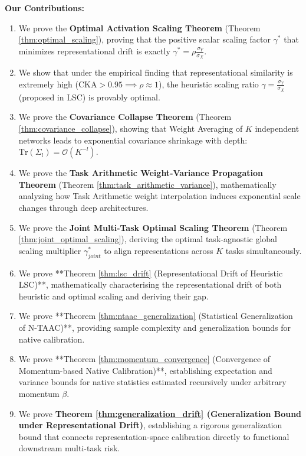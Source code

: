 \documentclass{article}
\theoremstyle{plain}
\theoremstyle{definition}
\theoremstyle{remark}
\begin{document}
\textbf{Our Contributions:}
\begin{enumerate}
    \item We prove the \textbf{Optimal Activation Scaling Theorem} (Theorem \ref{thm:optimal_scaling}), proving that the positive scalar scaling factor $\gamma^*$ that minimizes representational drift is exactly $\gamma^* = \rho \frac{\sigma_Y}{\sigma_X}$.
    \item We show that under the empirical finding that representational similarity is extremely high ($\text{CKA} > 0.95 \implies \rho \approx 1$), the heuristic scaling ratio $\gamma = \frac{\sigma_Y}{\sigma_X}$ (proposed in LSC) is provably optimal.
    \item We prove the \textbf{Covariance Collapse Theorem} (Theorem \ref{thm:covariance_collapse}), showing that Weight Averaging of $K$ independent networks leads to exponential covariance shrinkage with depth: $\text{Tr}(\Sigma_l) = \mathcal{O}(K^{-l})$.
    \item We prove the \textbf{Task Arithmetic Weight-Variance Propagation Theorem} (Theorem \ref{thm:task_arithmetic_variance}), mathematically analyzing how Task Arithmetic weight interpolation induces exponential scale changes through deep architectures.
    \item We prove the \textbf{Joint Multi-Task Optimal Scaling Theorem} (Theorem \ref{thm:joint_optimal_scaling}), deriving the optimal task-agnostic global scaling multiplier $\gamma_{joint}^*$ to align representations across $K$ tasks simultaneously.
    \item We prove **Theorem \ref{thm:lsc_drift} (Representational Drift of Heuristic LSC)**, mathematically characterising the representational drift of both heuristic and optimal scaling and deriving their gap.
    \item We prove **Theorem \ref{thm:ntaac_generalization} (Statistical Generalization of N-TAAC)**, providing sample complexity and generalization bounds for native calibration.
    \item We prove **Theorem \ref{thm:momentum_convergence} (Convergence of Momentum-based Native Calibration)**, establishing expectation and variance bounds for native statistics estimated recursively under arbitrary momentum $\beta$.
    \item We prove \textbf{Theorem \ref{thm:generalization_drift} (Generalization Bound under Representational Drift)}, establishing a rigorous generalization bound that connects representation-space calibration directly to functional downstream multi-task risk.

\end{enumerate}
\end{document}
